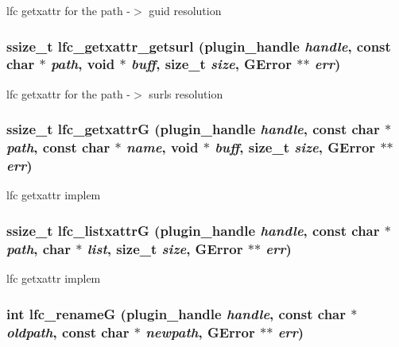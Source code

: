 lfc getxattr for the path -$>$ guid resolution 
\subsubsection{\setlength{\rightskip}{0pt plus 5cm}ssize\_\-t lfc\_\-getxattr\_\-getsurl (plugin\_\-handle {\em handle}, const char $\ast$ {\em path}, void $\ast$ {\em buff}, size\_\-t {\em size}, GError $\ast$$\ast$ {\em err})}\label{gfal__common__lfc_8c_65c91b05b7dea8642374bc4e3e477c19}


lfc getxattr for the path -$>$ surls resolution 
\subsubsection{\setlength{\rightskip}{0pt plus 5cm}ssize\_\-t lfc\_\-getxattr\-G (plugin\_\-handle {\em handle}, const char $\ast$ {\em path}, const char $\ast$ {\em name}, void $\ast$ {\em buff}, size\_\-t {\em size}, GError $\ast$$\ast$ {\em err})}\label{gfal__common__lfc_8c_81a95ba12afada4ce138ed309508f889}


lfc getxattr implem 
\subsubsection{\setlength{\rightskip}{0pt plus 5cm}ssize\_\-t lfc\_\-listxattr\-G (plugin\_\-handle {\em handle}, const char $\ast$ {\em path}, char $\ast$ {\em list}, size\_\-t {\em size}, GError $\ast$$\ast$ {\em err})}\label{gfal__common__lfc_8c_b1b1a0499ef8e0fda5a569d34b5e0bee}


lfc getxattr implem 
\subsubsection{\setlength{\rightskip}{0pt plus 5cm}int lfc\_\-rename\-G (plugin\_\-handle {\em handle}, const char $\ast$ {\em oldpath}, const char $\ast$ {\em newpath}, GError $\ast$$\ast$ {\em err})}\label{gfal__common__lfc_8c_b9390ad8a22cb5a0137547bb894d85b7}


